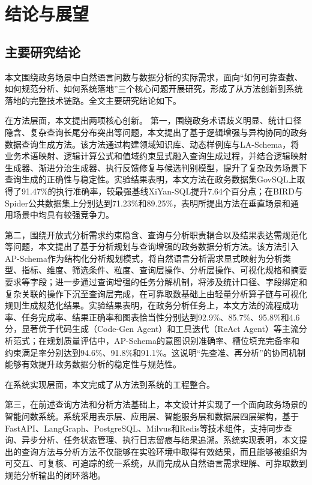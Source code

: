 \chapter*{结论与展望}
\setcounter{section}{0}

\section{主要研究结论}

本文围绕政务场景中自然语言问数与数据分析的实际需求，面向“如何可靠查数、如何规范分析、如何系统落地”三个核心问题开展研究，形成了从方法创新到系统落地的完整技术链路。全文主要研究结论如下。

在方法层面，本文提出两项核心创新。
第一，围绕政务术语歧义明显、统计口径隐含、复杂查询长尾分布突出等问题，本文提出了基于逻辑增强与异构协同的政务数据查询生成方法。该方法通过构建领域知识库、动态样例库与LA-Schema，将业务术语映射、逻辑计算公式和值域约束显式融入查询生成过程，并结合逻辑映射生成器、渐进分治生成器、执行反馈修复与候选判别模型，提升了复杂政务场景下查询生成的正确性与稳定性。实验结果表明，本文方法在政务数据集GovSQL上取得了91.47\%的执行准确率，较最强基线XiYan-SQL提升7.64个百分点；在BIRD与Spider公共数据集上分别达到71.23\%和89.25\%，表明所提出方法在垂直场景和通用场景中均具有较强竞争力。

第二，围绕开放式分析需求约束隐含、查询与分析职责耦合以及结果表达需规范化等问题，本文提出了基于分析规划与查询增强的政务数据分析方法。该方法引入AP-Schema作为结构化分析规划模式，将自然语言分析需求显式映射为分析类型、指标、维度、筛选条件、粒度、查询层操作、分析层操作、可视化规格和摘要要求等字段；进一步通过查询增强的任务分解机制，将涉及统计口径、字段绑定和复杂关联的操作下沉至查询层完成，在可靠取数基础上由轻量分析算子链与可视化规则生成规范化结果。实验结果表明，在政务分析任务上，本文方法的流程成功率、任务完成率、结果正确率和图表恰当性分别达到92.9\%、85.7\%、95.8\%和4.6分，显著优于代码生成（Code-Gen Agent）和工具迭代（ReAct Agent）等主流分析范式；在规划质量评估中，AP-Schema的意图识别准确率、槽位填充完备率和约束满足率分别达到94.6\%、91.8\%和91.1\%。这说明“先查准、再分析”的协同机制能够有效提升政务数据分析的稳定性与规范性。

在系统实现层面，本文完成了从方法到系统的工程整合。

第三，在前述查询方法和分析方法基础上，本文设计并实现了一个面向政务场景的智能问数系统。系统采用表示层、应用层、智能服务层和数据层四层架构，基于FastAPI、LangGraph、PostgreSQL、Milvus和Redis等技术组件，支持同步查询、异步分析、任务状态管理、执行日志留痕与结果追溯。系统实现表明，本文提出的查询方法与分析方法不仅能够在实验环境中取得有效结果，而且能够被组织为可交互、可复核、可追踪的统一系统，从而完成从自然语言需求理解、可靠取数到规范分析输出的闭环落地。

